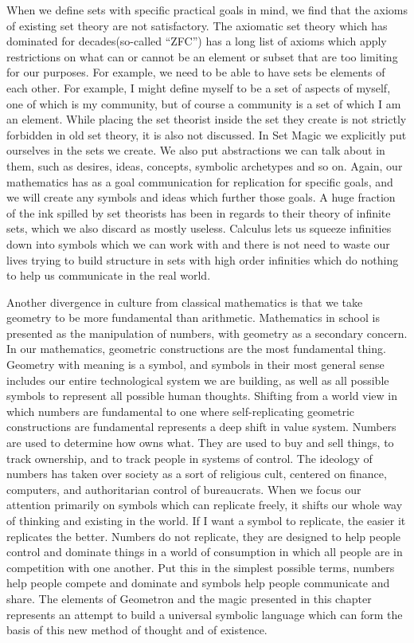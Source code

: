 When we define sets with specific practical goals in mind, we find that the axioms of existing set theory are not satisfactory.  The axiomatic set theory which has dominated for decades(so-called ``ZFC'') has a long list of axioms which apply restrictions on what can or cannot be an element or subset that are too limiting for our purposes.  For example, we need to be able to have sets be elements of each other.  For example, I might define myself to be a set of aspects of myself, one of which is my community, but of course a community is a set of which I am an element.  While placing the set theorist inside the set they create is not strictly forbidden in old set theory, it is also not discussed.  In Set Magic we explicitly put ourselves in the sets we create.  We also put abstractions we can talk about in them, such as desires, ideas, concepts, symbolic archetypes and so on.  Again, our mathematics has as a goal communication for replication for specific goals, and we will create any symbols and ideas which further those goals.  A huge fraction of the ink spilled by set theorists has been in regards to their theory of infinite sets, which we also discard as mostly useless.  Calculus lets us squeeze infinities down into symbols which we can work with and there is not need to waste our lives trying to build structure in sets with high order infinities which do nothing to help us communicate in the real world.

Another divergence in culture from classical mathematics is that we take geometry to be more fundamental than arithmetic.  Mathematics in school is presented as the manipulation of numbers, with geometry as a secondary concern.  In our mathematics, geometric constructions are the most fundamental thing.  Geometry with meaning is a symbol, and symbols in their most general sense includes our entire technological system we are building, as well as all possible symbols to represent all possible human thoughts.  Shifting from a world view in which numbers are fundamental to one where self-replicating geometric constructions are fundamental represents a deep shift in value system. Numbers are used to determine how owns what.  They are used to buy and sell things, to track ownership, and to track people in systems of control.  The ideology of numbers has taken over society as a sort of religious cult, centered on finance, computers, and authoritarian control of bureaucrats.  When we focus our attention primarily on symbols which can replicate freely, it shifts our whole way of thinking and existing in the world.  If I want a symbol to replicate, the easier it replicates the better.  Numbers do not replicate, they are designed to help people control and dominate things in a world of consumption in which all people are in competition with one another.  Put this in the simplest possible terms, numbers help people compete and dominate and symbols help people communicate and share.  The elements of Geometron and the magic presented in this chapter represents an attempt to build a universal symbolic language which can form the basis of this new method of thought and of existence.  


